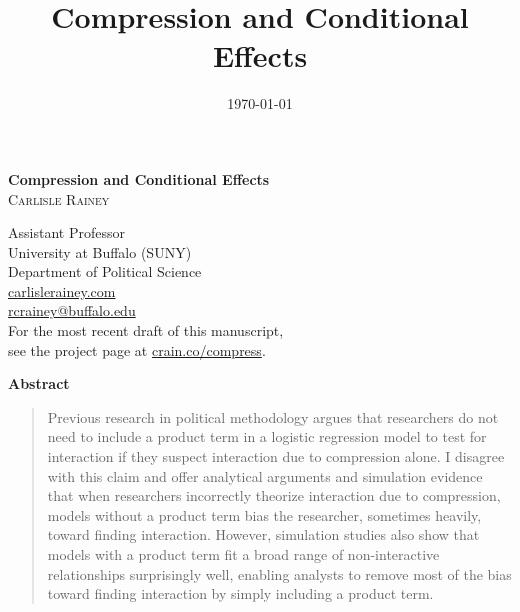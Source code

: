 \documentclass[12pt]{article}
\title{Compression and Conditional Effects}
\date{\today}
\begin{document}
\begin{center}
\LARGE{\textbf{Compression and Conditional Effects}}\\\vspace{4mm}
\normalsize{\textsc{Carlisle Rainey}}\\\vspace{2mm}
\begin{small}\singlespace
Assistant Professor\\
University at Buffalo (SUNY)\\
Department of Political Science\\
\href{http://www.carlislerainey.com}{carlislerainey.com}\\
\href{mailto:rcrainey@buffalo.edu}{rcrainey@buffalo.edu}\\\vspace{4mm}
For the most recent draft of this manuscript,\\see the project page at \href{http://www.carlislerainey.com/research/compression-and-conditional-effects/}{crain.co/compress}.
\end{small}
\end{center}

\thispagestyle{empty}
{\centerline{\textbf{Abstract}}}
\begin{quote}\noindent Previous research in political methodology argues that researchers do not need to include a product term in a logistic regression model to test for interaction if they suspect interaction due to compression alone. I disagree with this claim and offer analytical arguments and simulation evidence that when researchers incorrectly theorize interaction due to compression, models without a product term bias the researcher, sometimes heavily, toward finding interaction. However, simulation studies also show that models with a product term fit a broad range of non-interactive relationships surprisingly well, enabling analysts to remove most of the bias toward finding interaction by simply including a product term.\end{quote}
\thispagestyle{empty}
\singlespace
\setcounter{page}{1}
\end{document}
